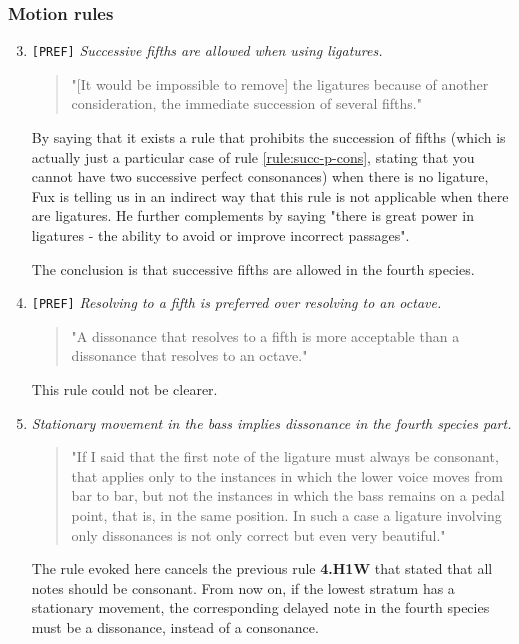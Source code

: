 \subsubsection{Motion rules}
\begin{enumerate}[wide, label=\bfseries 4.P\arabic*]
\setcounter{enumi}{2}
    \item \texttt{[PREF]} \textit{Successive fifths are allowed when using ligatures.} \label{rule:successive-fifths-in-4th-species}    
    \begin{quotation}
        "[It would be impossible to remove] the ligatures because of another consideration, the immediate succession of several fifths."
        \textcite[p.95]{GaPEng}
    \end{quotation}
    By saying that it exists a rule that prohibits the succession of fifths (which is actually just a particular case of rule \ref{rule:succ-p-cons}, stating that you cannot have two successive perfect consonances) when there is no ligature, Fux is telling us in an indirect way that this rule is not applicable when there are ligatures. He further complements by saying "there is great power in ligatures - the ability to avoid or improve incorrect passages".
    
    The conclusion is that successive fifths are allowed in the fourth species.

    \item \texttt{[PREF]} \textit{Resolving to a fifth is preferred over resolving to an octave.} \label{rule:resolving-to-fifths-rather-than-octaves}    
    \begin{quotation}
        "A dissonance that resolves to a fifth is more acceptable than a dissonance that resolves to an octave."
        \textcite[p.98]{GaPEng}
    \end{quotation}
    This rule could not be clearer.
    
    \item \textit{Stationary movement in the bass implies dissonance in the fourth species part.} \label{rule:dissonance-in-4th-species}
    \begin{quotation}
        "If I said that the first note of the ligature must always be consonant, that applies only to the instances in which the lower voice moves from bar to bar, but not the instances in which the bass remains on a pedal point, that is, in the same position. In such a case a ligature involving only dissonances is not only correct but even very beautiful."
        \textcite[p.98]{GaPEng}
    \end{quotation}
    The rule evoked here cancels the previous rule \textbf{4.H1W} that stated that all notes should be consonant. From now on, if the lowest stratum has a stationary movement, the corresponding delayed note in the fourth species must be a dissonance, instead of a consonance.    



\end{enumerate}
